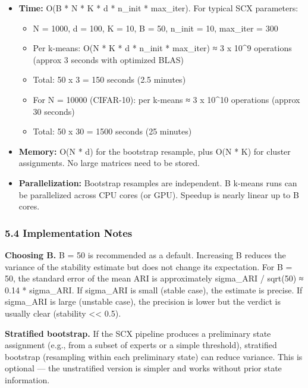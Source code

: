 \documentclass[
  12pt,
]{ctexart}
\providecommand{\tightlist}{%
  \setlength{\itemsep}{0pt}\setlength{\parskip}{0pt}}
\begin{document}
\begin{itemize}
\item
  \textbf{Time:} O(B * N * K * d * n\_init * max\_iter). For typical SCX
  parameters:

  \begin{itemize}
  \tightlist
  \item
    N = 1000, d = 100, K = 10, B = 50, n\_init = 10, max\_iter = 300
  \item
    Per k-means: O(N * K * d * n\_init * max\_iter) ≈ 3 x 10\^{}9
    operations (approx 3 seconds with optimized BLAS)
  \item
    Total: 50 x 3 = 150 seconds (2.5 minutes)
  \item
    For N = 10000 (CIFAR-10): per k-means ≈ 3 x 10\^{}10 operations
    (approx 30 seconds)
  \item
    Total: 50 x 30 = 1500 seconds (25 minutes)
  \end{itemize}
\item
  \textbf{Memory:} O(N * d) for the bootstrap resample, plus O(N * K)
  for cluster assignments. No large matrices need to be stored.
\item
  \textbf{Parallelization:} Bootstrap resamples are independent. B
  k-means runs can be parallelized across CPU cores (or GPU). Speedup is
  nearly linear up to B cores.
\end{itemize}

\subsubsection{5.4 Implementation Notes}\label{implementation-notes}

\textbf{Choosing B.} B = 50 is recommended as a default. Increasing B
reduces the variance of the stability estimate but does not change its
expectation. For B = 50, the standard error of the mean ARI is
approximately sigma\_ARI / sqrt(50) ≈ 0.14 * sigma\_ARI. If sigma\_ARI
is small (stable case), the estimate is precise. If sigma\_ARI is large
(unstable case), the precision is lower but the verdict is usually clear
(stability \textless\textless{} 0.5).

\textbf{Stratified bootstrap.} If the SCX pipeline produces a
preliminary state assignment (e.g., from a subset of experts or a simple
threshold), stratified bootstrap (resampling within each preliminary
state) can reduce variance. This is optional --- the unstratified
version is simpler and works without prior state information.
\end{document}
